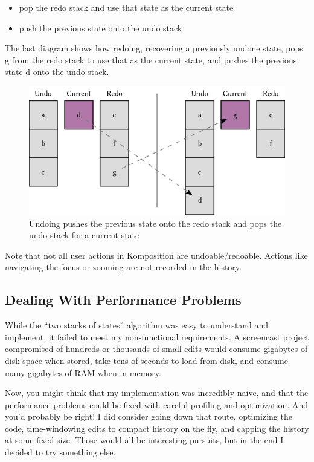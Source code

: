 \begin{itemize}
\item pop the redo stack and use that state as the current state
\item push the previous state onto the undo stack
\end{itemize}
The last diagram shows how redoing, recovering a previously undone state, pops g from the redo stack to use that as the current state, and pushes the previous state d onto the undo stack.
\begin{figure}[htbp]
 \centering
 \includegraphics[width=.95\linewidth]{./pics/case3_3.png}
 \caption{Undoing pushes the previous state onto the redo stack and pops the undo stack for a current state}
 \label{fig:case3_3}
\end{figure}
Note that not all user actions in Komposition are undoable/redoable. Actions like navigating the focus or zooming are not recorded in the history.


\subsection{Dealing With Performance Problems}

While the ``two stacks of states'' algorithm was easy to understand and implement, it failed to meet my non-functional requirements. A screencast project compromised of hundreds or thousands of small edits would consume gigabytes of disk space when stored, take tens of seconds to load from disk, and consume many gigabytes of RAM when in memory.

Now, you might think that my implementation was incredibly naive, and that the performance problems could be fixed with careful profiling and optimization. And you'd probably be right! I did consider going down that route, optimizing the code, time-windowing edits to compact history on the fly, and capping the history at some fixed size. Those would all be interesting pursuits, but in the end I decided to try something else.


